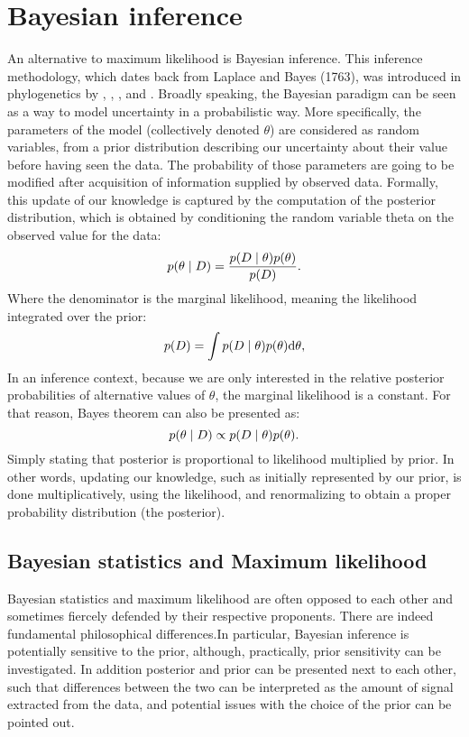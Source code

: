 \section{Bayesian inference}
\label{sec:intro-bayesian}

An alternative to maximum likelihood is Bayesian inference.
This inference methodology, which dates back from Laplace and Bayes (1763), was introduced in phylogenetics by \citet{Yang1997}, \citet{Mau1999}, \citet{Larget1999}, \citet{Li2000} and \citet{Huelsenbeck2001}.
Broadly speaking, the Bayesian paradigm can be seen as a way to model uncertainty in a probabilistic way.
More specifically, the parameters of the model (collectively denoted $\theta$) are considered as random variables, from a prior distribution describing our uncertainty about their value before having seen the data.
The probability of those parameters are going to be modified after acquisition of information supplied by observed data.
Formally, this update of our knowledge is captured by the computation of the posterior distribution, which is obtained by conditioning the random variable theta on the observed value for the data:
\begin{equation}
    p(\theta \mid D)=\frac{p(D \mid \theta)p(\theta)}{p(D)}.
\end{equation}
Where the denominator is the marginal likelihood, meaning the likelihood integrated over the prior:
\begin{equation}
    p(D) = \int p(D \mid \theta) p(\theta) \mathrm{d} \theta,
\end{equation}
In an inference context, because we are only interested in the relative posterior probabilities of alternative values of $\theta$, the marginal likelihood is a constant.
For that reason, Bayes theorem can also be presented as:
\begin{equation}
    p(\theta \mid D) \propto p(D \mid \theta)p(\theta).
\end{equation}
Simply stating that posterior is proportional to likelihood multiplied by prior.
In other words, updating our knowledge, such as initially represented by our prior, is done multiplicatively, using the likelihood, and renormalizing to obtain a proper probability distribution (the posterior).

\subsection{Bayesian statistics and {Maximum likelihood}}
Bayesian statistics and maximum likelihood are often opposed to each other and sometimes fiercely defended by their respective proponents.
There are indeed fundamental philosophical differences.In particular, Bayesian inference is potentially sensitive to the prior, although, practically, prior sensitivity can be investigated.
In addition posterior and prior can be presented next to each other, such that differences between the two can be interpreted as the amount of signal extracted from the data, and potential issues with the choice of the prior can be pointed out.

